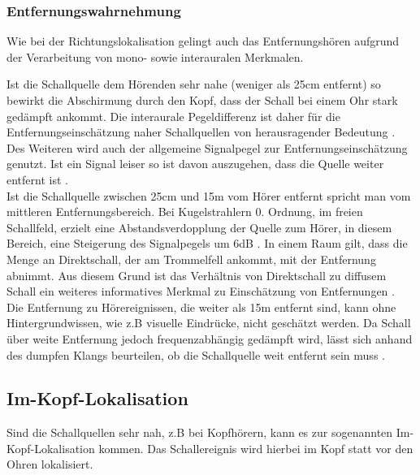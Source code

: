 \subsubsection{Entfernungswahrnehmung}

Wie bei der Richtungslokalisation gelingt auch das Entfernungshören aufgrund der Verarbeitung von mono- sowie interauralen Merkmalen.

Ist die Schallquelle dem Hörenden sehr nahe (weniger als 25cm entfernt) so bewirkt die Abschirmung durch den Kopf, dass der Schall bei einem Ohr stark gedämpft ankommt. Die interaurale Pegeldifferenz ist daher für die Entfernungseinschätzung naher Schallquellen von herausragender Bedeutung \cite[S.98]{HdA08}.\\

Des Weiteren wird auch der allgemeine Signalpegel zur Entfernungseinschätzung genutzt. Ist ein Signal leiser so ist davon auszugehen, dass die Quelle weiter entfernt ist \cite[S.98]{HdA08}.\\

Ist die Schallquelle zwischen 25cm und 15m vom Hörer entfernt spricht man vom mittleren Entfernungsbereich. Bei Kugelstrahlern 0. Ordnung, im freien Schallfeld, erzielt eine Abstandsverdopplung der Quelle zum Hörer, in diesem Bereich, eine Steigerung des Signalpegels um 6dB \cite[S.98]{HdA08}. In einem Raum gilt, dass die Menge an Direktschall, der am Trommelfell ankommt, mit der Entfernung abnimmt. Aus diesem Grund ist das Verhältnis von Direktschall zu diffusem Schall ein weiteres informatives Merkmal zu Einschätzung von Entfernungen \cite[S.57]{Heidermanns1979}.
\\

Die Entfernung zu Hörereignissen, die weiter als 15m entfernt sind, kann ohne Hintergrundwissen, wie z.B visuelle Eindrücke, nicht geschätzt werden. Da Schall über weite Entfernung jedoch frequenzabhängig gedämpft wird, lässt sich anhand des dumpfen Klangs beurteilen, ob die Schallquelle weit entfernt sein muss \cite[S.99]{HdA08}. 

\subsection{Im-Kopf-Lokalisation}

Sind die Schallquellen sehr nah, z.B bei Kopfhörern, kann es zur sogenannten Im-Kopf-Lokalisation kommen. Das Schallereignis wird hierbei im Kopf statt vor den Ohren lokalisiert. \\ 

